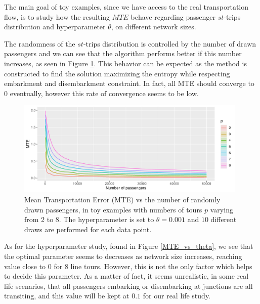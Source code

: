 \documentclass{bmcart}
\begin{document}
The main goal of toy examples, since we have access to the real transportation flow, is to study how the resulting $MTE$ behave regarding passenger $st$-trips distribution and hyperparameter $\theta$, on different network sizes. 

The randomness of the $st$-trips distribution is controlled by the number of drawn passengers and we can see that the algorithm performs better if this number increases, as seen in Figure \ref{MTE_vs_passengers}. This behavior can be expected as the method is constructed to find the solution maximizing the entropy while respecting embarkment and disembarkment constraint. In fact, all MTE should converge to $0$ eventually, however this rate of convergence seems to be low.
\begin{figure}[h]
	\includegraphics[width=0.98\textwidth]{fig/MTE_passengers.pdf}
	\caption{Mean Transportation Error (MTE) vs the number of randomly drawn passengers, in toy examples with numbers of tours $p$ varying from 2 to 8. The hyperparameter is set to $\theta=0.001$ and $10$ different draws are performed for each data point.}
	\label{MTE_vs_passengers}
\end{figure}
As for the hyperparameter study, found in Figure \ref{MTE_vs_theta}, we see that the optimal parameter seems to decreases as network size increases, reaching value close to $0$ for $8$ line tours. However, this is not the only factor which helps to decide this parameter. As a matter of fact, it seems unrealistic, in some real life scenarios, that all passengers embarking or disembarking at junctions are all transiting, and this value will be kept at $0.1$ for our real life study.
\end{document}

